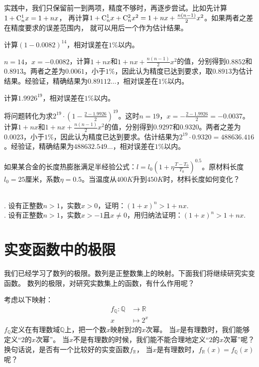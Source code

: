\documentclass[12pt,UTF8,fontset=none]{ctexbook}
\begin{document}
实践中，我们只保留前一到两项，精度不够时，再逐步尝试。比如先计算$1 + \mathrm{C}_{n}^{1}x = 1 + nx$，
再计算$1 + \mathrm{C}_{n}^{1}x + \mathrm{C}_{n}^{2}x^2 = 1 + nx + \frac{n(n-1)}{2}x^2$。如果两者之差在精度要求的误差范围内，
就可以用后一个作为估计结果。
\begin{et}
    计算$(1 - 0.0082)^{14}$，相对误差在$1\%$以内。
\end{et}
\begin{so}
    $n=14$，$x=-0.0082$，计算$1 + nx$和$1 + nx + \frac{n(n-1)}{2}x^2$的值，分别得到$0.8852$和$0.8913$。两者之差为$0.0061$，小于$1\%$，因此认为精度已达到要求，取$0.8913$为估计结果。经验证，精确结果为$0.89112\dots$，相对误差在$1\%$以内。
\end{so}
\begin{et}
    计算$1.9926^{19}$，相对误差在$1\%$以内。
\end{et}
\begin{so}
    将问题转化为求$2^{19}\cdot\left(1-\frac{2-1.9926}{2}\right)^{19}$。这时$n=19$，$x = -\frac{2-1.9926}{2} = -0.0037$。计算$1 + nx$和$1 + nx + \frac{n(n-1)}{2}x^2$的值，分别得到$0.9297$和$0.9320$。两者之差为$0.0023$，小于$1\%$，因此认为精度已达到要求。估计结果为$2^{19}\cdot 0.9320=488636.416$。经验证，精确结果为$488632.549\dots$，相对误差在$1\%$以内。
\end{so}

\begin{sk}
    如果某合金的长度热膨胀满足半经验公式：$l = l_0(1+\eta\frac{T-T_0}{T_0})^{0.5}$。原材料长度$l_0=25$厘米，系数$\eta=0.5$。当温度从$400K$升到$450K$时，材料长度如何变化？
\end{sk}

\begin{xt}
    \mbox{} \\
    . 设有正整数$n > 1$，实数$x > 0$，证明：$(1 + x)^n > 1 + nx.$\\
    . 设有正整数$n > 1$，实数$x > -1$且$x \neq 0$，用归纳法证明：$(1 + x)^n > 1 + nx.$
\end{xt}

\chapter{实变函数中的极限}
我们已经学习了数列的极限。数列是正整数集上的映射。下面我们将继续研究实变函数。
数列的极限，对研究实数集上的函数，有什么作用呢？

考虑以下映射：
\begin{align*}
    f_{\mathbb{Q}}: \mathbb{Q} &\rightarrow \mathbb{R} \\
    x &\mapsto 2^x 
\end{align*}
$f_{\mathbb{Q}}$定义在有理数域$\mathbb{Q}$上，把一个数$x$映射到$2$的$x$次幂。
当$x$是有理数时，我们能够定义“$2$的$x$次幂”。
当$x$不是有理数的时候，我们能不能合理地定义“$2$的$x$次幂”呢？换句话说，是否有一个比较好的实变函数$f_{\mathbb{R}}$，
当$x$是有理数时，$f_{\mathbb{R}}(x) = f_{\mathbb{Q}}(x)$呢？
\end{document}

